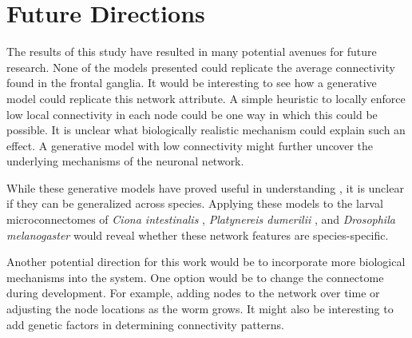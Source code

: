 \section{Future Directions}

The results of this study have resulted in many potential avenues for future research.
None of the models presented could replicate the average connectivity found in the \ce frontal ganglia. 
It would be interesting to see how a generative model could replicate this network attribute.
A simple heuristic to locally enforce low local connectivity in each node could be one way in which this could be possible.
It is unclear what biologically realistic mechanism could explain such an effect.
A generative model with low connectivity might further uncover the underlying mechanisms of the \ce neuronal network.

While these generative models have proved useful in understanding \ce, it is unclear if they can be generalized across species. 
Applying these models to the larval microconnectomes of \textit{Ciona intestinalis} \citep{Ryan}, \textit{Platynereis dumerilii} \citep{Veraszto}, and \textit{Drosophila melanogaster} \citep{Winding} would reveal whether these network features are species-specific.

Another potential direction for this work would be to incorporate more biological mechanisms into the system.
One option would be to change the connectome during development. 
For example, adding nodes to the network over time or adjusting the node locations as the worm grows. 
It might also be interesting to add genetic factors in determining connectivity patterns. 









